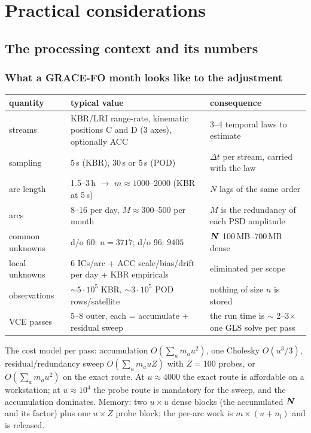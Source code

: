 \part{Practical considerations}

\chapter{The processing context and its numbers}
\label{ch:practice}

\section{What a GRACE-FO month looks like to the adjustment}

\begin{tabular}{@{}P{32mm}P{70mm}P{54mm}@{}}
\toprule
quantity & typical value & consequence\\
\midrule
streams & KBR/LRI range-rate, kinematic positions C and D (3 axes), optionally ACC & 3--4 temporal laws to estimate\\
sampling & 5\,s (KBR), 30\,s or 5\,s (POD) & $\Delta t$ per stream, carried with the law\\
arc length & 1.5--3\,h $\to$ $m \approx 1000$--2000 (KBR at 5\,s) & $N$ lags of the same order\\
arcs & 8--16 per day, $M \approx 300$--500 per month & $M$ is the redundancy of each PSD amplitude\\
common unknowns & d/o 60: $u = 3717$; d/o 96: $9405$ & $\bm{N}$ 100\,MB--700\,MB dense\\
local unknowns & 6 ICs/arc + ACC scale/bias/drift per day + KBR empiricals & eliminated per scope\\
observations & $\sim 5\cdot10^5$ KBR, $\sim 3\cdot10^5$ POD rows/satellite & nothing of size $n$ is stored\\
VCE passes & 5--8 outer, each = accumulate + residual sweep & the run time is $\sim$ 2--3$\times$ one GLS solve per pass\\
\bottomrule
\end{tabular}

The cost model per pass: accumulation $O(\sum_a m_a u^2)$, one Cholesky $O(u^3/3)$, residual/redundancy sweep $O(\sum_a m_a u Z)$ with $Z=100$ probes, or $O(\sum_a m_a u^2)$ on the exact route. At $u \approx 4000$ the exact route is affordable on a workstation; at $u\approx 10^4$ the probe route is mandatory for the sweep, and the accumulation dominates. Memory: two $u\times u$ dense blocks (the accumulated $\bm{N}$ and its factor) plus one $u\times Z$ probe block; the per-arc work is $m\times(u+n_l)$ and is released.

